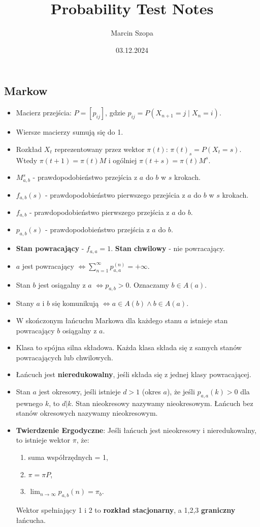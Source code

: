 \documentclass{article}
\title{Probability Test Notes}
\author{Marcin Szopa}
\date{03.12.2024}
\theoremstyle{definition}
\theoremstyle{remark}
\begin{document}
\begin{multicols}{2}
    \section*{Markow}
    \begin{itemize}[itemsep=0pt, left=0pt]
        \item Macierz przejścia: \( P = [p_{ij}] \), gdzie \( p_{ij} = P(X_{n+1} = j \mid X_n = i) \).
        \item Wiersze macierzy sumują się do 1.
        \item Rozkład \(X_t\) reprezentowany przez wektor \(\pi(t)\): \(\pi(t)_s = P(X_t = s)\). Wtedy \(\pi(t + 1) = \pi(t)M\) i ogólniej \(\pi(t + s) = \pi(t)M^s\).
        \item \(M_{a,b}^{s}\) - prawdopodobieństwo przejścia z \(a\) do \(b\) w \(s\) krokach.
        \item \(f_{a,b}(s)\) - prawdopodobieństwo pierwszego przejścia z \(a\) do \(b\) w \(s\) krokach.
        \item \(f_{a,b}\) - prawdopodobieństwo pierwszego przejścia z \(a\) do \(b\).
        \item \(p_{a,b}(s)\) - prawdopodobieństwo przejścia z \(a\) do \(b\).
        \item \textbf{Stan powracający} - \(f_{a,a} = 1\). \textbf{Stan chwilowy} - nie powracający.
        \item \(a\) jest powracający \(\iff \sum_{n=1}^{\infty} p_{a,a}^{(n)} = +\infty\).
        \item Stan \(b\) jest osiągalny z \(a\) \(\iff p_{a,b} > 0\). Oznaczamy \(b \in A(a)\).
        \item Stany \(a\) i \(b\) się komunikują \(\iff a \in A(b) \land b \in A(a)\).
        \item W skończonym łańcuchu Markowa dla każdego stanu \(a\) istnieje stan powracający \(b\) osiągalny z \(a\).
        \item Klasa to spójna silna składowa. Każda klasa składa się z samych stanów powracających lub chwilowych.
        \item Łańcuch jest \textbf{nieredukowalny}, jeśli składa się z jednej klasy powracającej.
        \item Stan \(a\) jest okresowy, jeśli istnieje \(d > 1\) (okres \(a\)), że jeśli \(p_{a,a}(k) > 0\) dla pewnego \(k\), to \(d | k\). Stan nieokresowy nazywamy nieokresowym. Łańcuch bez stanów okresowych nazywamy nieokresowym.
        
        \item \textbf{Twierdzenie Ergodyczne}: Jeśli łańcuch jest nieokresowy i nieredukowalny, to istnieje wektor \(\pi\), że:
        \begin{enumerate}
            \item suma współrzędnych = 1,
            \item \(\pi = \pi P\),
            \item \(\lim_{n \to \infty} p_{a,b}(n) = \pi_b\).
        \end{enumerate}  
        Wektor spełniający 1 i 2 to \textbf{rozkład stacjonarny}, a 1,2,3 \textbf{graniczny} łańcucha.
    \end{itemize}
        


\end{multicols}
\end{document}
